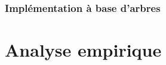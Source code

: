 \documentclass[11pt]{article}
\begin{document}
\subsubsection{Implémentation à base d'arbres}

\section{Analyse empirique}
\end{document}
